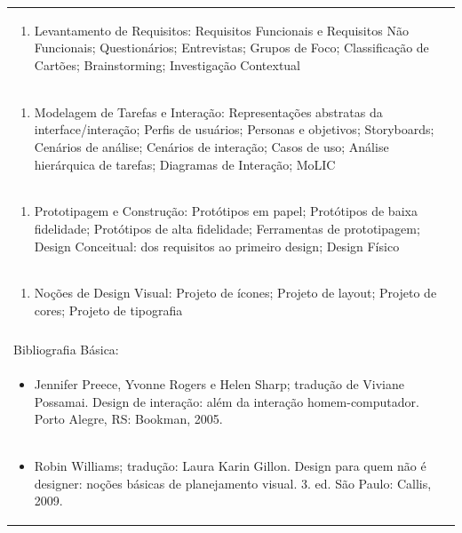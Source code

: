 \documentclass[11pt]{article}
\begin{document}
\begin{center}
\begin{longtable}{|p{4cm}|p{4cm}|p{4cm}|p{4cm}|}
\multicolumn{4}{|p{\dimexpr 16cm + 6\tabcolsep\relax}|}{\begin{enumerate}[start=2]\item Levantamento de Requisitos: Requisitos Funcionais e Requisitos Não Funcionais; Questionários; Entrevistas; Grupos de Foco; Classificação de Cartões; Brainstorming; Investigação Contextual\end{enumerate}}\\
\multicolumn{4}{|p{\dimexpr 16cm + 6\tabcolsep\relax}|}{\begin{enumerate}[start=3]\item Modelagem de Tarefas e Interação: Representações abstratas da interface/interação; Perfis de usuários; Personas e objetivos; Storyboards; Cenários de análise; Cenários de interação; Casos de uso; Análise hierárquica de tarefas; Diagramas de Interação; MoLIC\end{enumerate}}\\
\multicolumn{4}{|p{\dimexpr 16cm + 6\tabcolsep\relax}|}{\begin{enumerate}[start=4]\item Prototipagem e Construção: Protótipos em papel; Protótipos de baixa fidelidade; Protótipos de alta fidelidade; Ferramentas de prototipagem; Design Conceitual: dos requisitos ao primeiro design; Design Físico\end{enumerate}}\\
\multicolumn{4}{|p{\dimexpr 16cm + 6\tabcolsep\relax}|}{\begin{enumerate}[start=5]\item Noções de Design Visual: Projeto de ícones; Projeto de layout; Projeto de cores; Projeto de tipografia\end{enumerate}}\\
\multicolumn{4}{|p{\dimexpr 16cm + 6\tabcolsep\relax}|}{}\\
\hline
\multicolumn{4}{|p{16cm}|}{Bibliografia Básica:}\\*
\multicolumn{4}{|p{\dimexpr 16cm + 6\tabcolsep\relax}|}{\begin{itemize}\item Jennifer Preece, Yvonne Rogers e Helen Sharp; tradução de Viviane Possamai. Design de interação: além da interação homem-computador. Porto Alegre, RS: Bookman, 2005.\end{itemize}}\\
\multicolumn{4}{|p{\dimexpr 16cm + 6\tabcolsep\relax}|}{\begin{itemize}\item Robin Williams; tradução: Laura Karin Gillon. Design para quem não é designer: noções básicas de planejamento visual. 3. ed. São Paulo: Callis, 2009.\end{itemize}}\\

\end{longtable}
\end{center}
\end{document}
